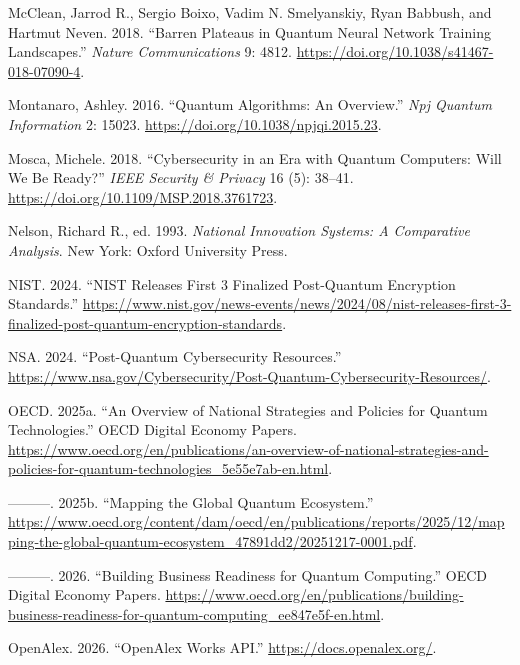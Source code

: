 \documentclass[
  11pt,
  letterpaper,
]{article}
\newlength{\cslhangindent}
\newenvironment{CSLReferences}[2] %
 {\begin{list}{}{%
  \setlength{\itemindent}{0pt}
  \setlength{\leftmargin}{0pt}
  \setlength{\parsep}{0pt}
  \ifodd #1
   \setlength{\leftmargin}{\cslhangindent}
   \setlength{\itemindent}{-1\cslhangindent}
  \fi
  \setlength{\itemsep}{#2\baselineskip}}}
 {\end{list}}
\begin{document}
\begin{CSLReferences}{1}{0}
McClean, Jarrod R., Sergio Boixo, Vadim N. Smelyanskiy, Ryan Babbush,
and Hartmut Neven. 2018. {``Barren Plateaus in Quantum Neural Network
Training Landscapes.''} \emph{Nature Communications} 9: 4812.
\url{https://doi.org/10.1038/s41467-018-07090-4}.

Montanaro, Ashley. 2016. {``Quantum Algorithms: An Overview.''}
\emph{Npj Quantum Information} 2: 15023.
\url{https://doi.org/10.1038/npjqi.2015.23}.

Mosca, Michele. 2018. {``Cybersecurity in an Era with Quantum Computers:
Will We Be Ready?''} \emph{IEEE Security \& Privacy} 16 (5): 38--41.
\url{https://doi.org/10.1109/MSP.2018.3761723}.

Nelson, Richard R., ed. 1993. \emph{National Innovation Systems: A
Comparative Analysis}. New York: Oxford University Press.

NIST. 2024. {``NIST Releases First 3 Finalized Post-Quantum Encryption
Standards.''}
\url{https://www.nist.gov/news-events/news/2024/08/nist-releases-first-3-finalized-post-quantum-encryption-standards}.

NSA. 2024. {``Post-Quantum Cybersecurity Resources.''}
\url{https://www.nsa.gov/Cybersecurity/Post-Quantum-Cybersecurity-Resources/}.

OECD. 2025a. {``An Overview of National Strategies and Policies for
Quantum Technologies.''} OECD Digital Economy Papers.
\url{https://www.oecd.org/en/publications/an-overview-of-national-strategies-and-policies-for-quantum-technologies_5e55e7ab-en.html}.

---------. 2025b. {``Mapping the Global Quantum Ecosystem.''}
\url{https://www.oecd.org/content/dam/oecd/en/publications/reports/2025/12/mapping-the-global-quantum-ecosystem_47891dd2/20251217-0001.pdf}.

---------. 2026. {``Building Business Readiness for Quantum
Computing.''} OECD Digital Economy Papers.
\url{https://www.oecd.org/en/publications/building-business-readiness-for-quantum-computing_ee847e5f-en.html}.

OpenAlex. 2026. {``OpenAlex Works API.''}
\url{https://docs.openalex.org/}.


\end{CSLReferences}
\end{document}
